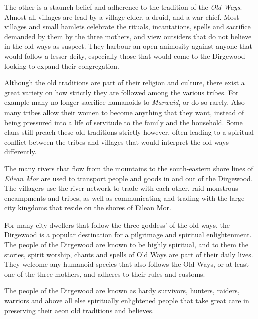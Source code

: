 The other is a staunch belief and adherence to the tradition of the
\emph{Old Ways}. Almost all villages are lead by a village elder, a druid, and
a war chief. Most villages and small hamlets celebrate the rituals,
incantations, spells and sacrifice demanded by them by the three mothers, and
view outsiders that do not believe in the old ways as suspect. They harbour an
open animosity against anyone that would follow a lesser deity, especially
those that would come to the Dirgewood looking to expand their congregation.

Although the old traditions are part of their religion and culture, there exist
a great variety on how strictly they are followed among the various tribes.
For example many no longer sacrifice humanoids to \emph{Marwaid}, or do so
rarely. Also many tribes allow their women to become anything that they want,
instead of being pressured into a life of servitude to the family and the
household. Some clans still preach these old traditions strictly however,
often leading to a spiritual conflict between the tribes and villages that
would interpret the old ways differently.

The many rivers that flow from the mountains to the south-eastern shore lines of
\emph{Eilean Mor} are used to transport people and goods in and out of the
Dirgewood. The villagers use the river network to trade with each other, raid
monstrous encampments and tribes, as well as communicating and trading with
the large city kingdoms that reside on the shores of Eilean Mor.

For many city dwellers that follow the three goddess' of the old ways, the
Dirgewood is a popular destination for a pilgrimage and spiritual
enlightenment. The people of the Dirgewood are known to be highly spiritual,
and to them the stories, spirit worship, chants and spells of Old Ways are
part of their daily lives. They welcome any humanoid species that also follows
the Old Ways, or at least one of the three mothers, and adheres to their rules
and customs.

The people of the Dirgewood are known as hardy survivors, hunters, raiders,
warriors and above all else spiritually enlightened people that take great
care in preserving their aeon old traditions and believes.
